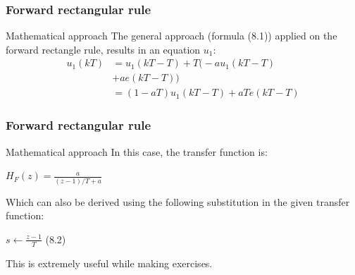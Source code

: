 \begin{frame}
	\frametitle{Forward rectangular rule}
	\begin{block}{Mathematical approach}
		The general approach (formula (8.1)) applied on the forward rectangle rule, results in an equation $u_1$:
		\begin{align*}
		u_1(kT)& =u_1(kT - T) + T\big(-au_1(kT - T)\\
		& + ae(kT - T) \big)\\
		& =(1 - aT)u_1(kT - T) + aTe(kT - T)
		\end{align*}
	\end{block}
\end{frame}

\begin{frame}
	\frametitle{Forward rectangular rule}
	\begin{block}{Mathematical approach}
		In this case, the transfer function is:
		\begin{center}
		$H_F(z) = \frac{a}{(z-1)/T+a}$
		\end{center}
		Which can also be derived using the following substitution in the given transfer function:
		\begin{center}
			$s \gets \frac{z-1}{T}$ (8.2)
		\end{center}
		This is extremely useful while making exercises.
	\end{block}
\end{frame}	


